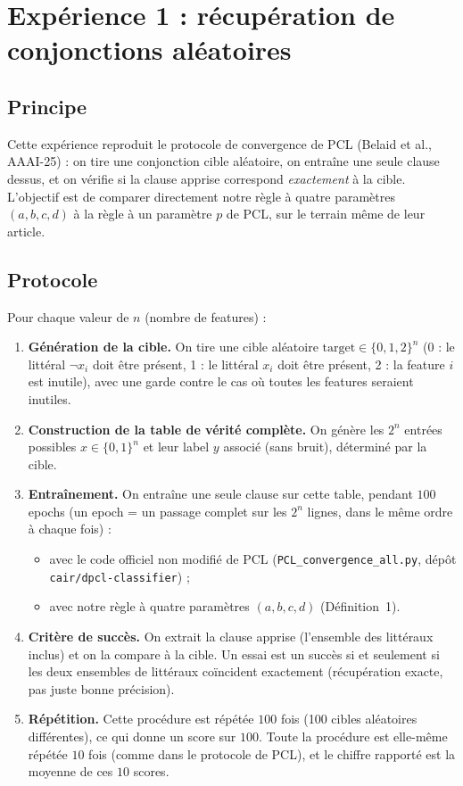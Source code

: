 \documentclass[11pt]{article}
\begin{document}
\section{Expérience 1 : récupération de conjonctions aléatoires}

\subsection{Principe}

Cette expérience reproduit le protocole de convergence de PCL (Belaid
et al., AAAI-25) : on tire une conjonction cible aléatoire, on entraîne
une seule clause dessus, et on vérifie si la clause apprise correspond
\emph{exactement} à la cible. L'objectif est de comparer directement
notre règle à quatre paramètres $(a,b,c,d)$ à la règle à un paramètre
$p$ de PCL, sur le terrain même de leur article.

\subsection{Protocole}

Pour chaque valeur de $n$ (nombre de features) :

\begin{enumerate}
\item \textbf{Génération de la cible.} On tire une cible aléatoire
$\text{target}\in\{0,1,2\}^n$ (0 : le littéral $\neg x_i$ doit être
présent, 1 : le littéral $x_i$ doit être présent, 2 : la feature $i$
est inutile), avec une garde contre le cas où toutes les features
seraient inutiles.

\item \textbf{Construction de la table de vérité complète.} On génère
les $2^n$ entrées possibles $x\in\{0,1\}^n$ et leur label $y$ associé
(sans bruit), déterminé par la cible.

\item \textbf{Entraînement.} On entraîne une seule clause sur cette
table, pendant $100$ epochs (un epoch = un passage complet sur les
$2^n$ lignes, dans le même ordre à chaque fois) :
\begin{itemize}
\item avec le code officiel non modifié de PCL (\texttt{PCL\_convergence\_all.py},
dépôt \texttt{cair/dpcl-classifier}) ;
\item avec notre règle à quatre paramètres $(a,b,c,d)$ (Définition~1).
\end{itemize}

\item \textbf{Critère de succès.} On extrait la clause apprise
(l'ensemble des littéraux inclus) et on la compare à la cible. Un essai
est un succès si et seulement si les deux ensembles de littéraux
coïncident exactement (récupération exacte, pas juste bonne précision).

\item \textbf{Répétition.} Cette procédure est répétée $100$ fois (100
cibles aléatoires différentes), ce qui donne un score sur $100$. Toute
la procédure est elle-même répétée $10$ fois (comme dans le protocole
de PCL), et le chiffre rapporté est la moyenne de ces $10$ scores.
\end{enumerate}
\end{document}
